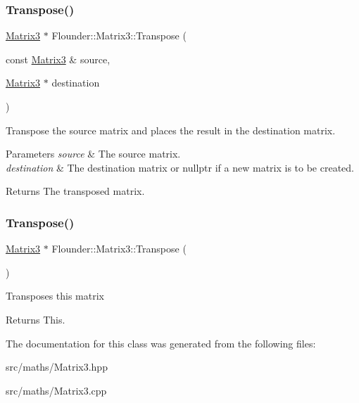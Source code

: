 \subsubsection{\texorpdfstring{Transpose()}{Transpose()}\hspace{0.1cm}{\footnotesize\ttfamily [1/2]}}
{\footnotesize\ttfamily \hyperlink{class_flounder_1_1_matrix3}{Matrix3} $\ast$ Flounder\+::\+Matrix3\+::\+Transpose (\begin{DoxyParamCaption}\item[{const \hyperlink{class_flounder_1_1_matrix3}{Matrix3} \&}]{source,  }\item[{\hyperlink{class_flounder_1_1_matrix3}{Matrix3} $\ast$}]{destination }\end{DoxyParamCaption})\hspace{0.3cm}{\ttfamily [static]}}



Transpose the source matrix and places the result in the destination matrix. 


\begin{DoxyParams}{Parameters}
{\em source} & The source matrix. \\
\hline
{\em destination} & The destination matrix or nullptr if a new matrix is to be created. \\
\hline
\end{DoxyParams}
\begin{DoxyReturn}{Returns}
The transposed matrix. 
\end{DoxyReturn}
\mbox{\label{class_flounder_1_1_matrix3_a45ca13f33f753b24b03ae557542167d5}} 
\subsubsection{\texorpdfstring{Transpose()}{Transpose()}\hspace{0.1cm}{\footnotesize\ttfamily [2/2]}}
{\footnotesize\ttfamily \hyperlink{class_flounder_1_1_matrix3}{Matrix3} $\ast$ Flounder\+::\+Matrix3\+::\+Transpose (\begin{DoxyParamCaption}{ }\end{DoxyParamCaption})}



Transposes this matrix 

\begin{DoxyReturn}{Returns}
This. 
\end{DoxyReturn}


The documentation for this class was generated from the following files\+:\begin{DoxyCompactItemize}
\item 
src/maths/Matrix3.\+hpp\item 
src/maths/Matrix3.\+cpp\end{DoxyCompactItemize}

